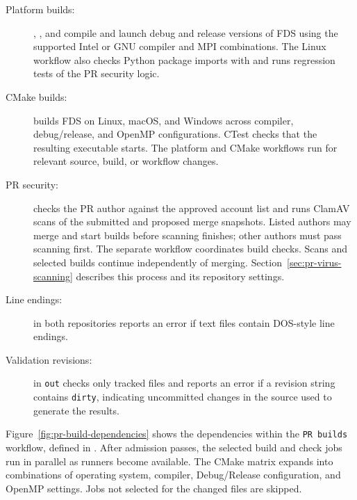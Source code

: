\documentclass[11pt]{book}
\begin{document}
\begin{description}
\item[Platform builds:] , , and  compile and launch debug and release versions of FDS using the supported Intel or GNU compiler and MPI combinations. The Linux workflow also checks Python package imports with  and runs regression tests of the PR security logic.

\item[CMake builds:]  builds FDS on Linux, macOS, and Windows across compiler, debug/release, and OpenMP configurations. CTest checks that the resulting executable starts. The platform and CMake workflows run for relevant source, build, or workflow changes.

\item[PR security:]  checks the PR author against the approved account list and runs ClamAV scans of the submitted and proposed merge snapshots. Listed authors may merge and start builds before scanning finishes; other authors must pass scanning first. The separate  workflow coordinates build checks. Scans and selected builds continue independently of merging. Section~\ref{sec:pr-virus-scanning} describes this process and its repository settings.

\item[Line endings:]  in both repositories reports an error if text files contain DOS-style line endings.

\item[Validation revisions:]  in \texttt{out} checks only tracked  files and reports an error if a revision string contains \texttt{dirty}, indicating uncommitted changes in the source used to generate the results.
\end{description}

Figure~\ref{fig:pr-build-dependencies} shows the dependencies within the \texttt{PR builds} workflow, defined in . After admission passes, the selected build and check jobs run in parallel as runners become available. The CMake matrix expands into combinations of operating system, compiler, Debug/Release configuration, and OpenMP settings. Jobs not selected for the changed files are skipped.
\end{document}

